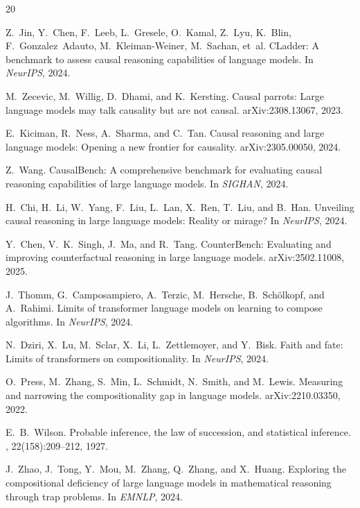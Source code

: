 \documentclass[11pt,a4paper]{article}
\begin{document}
\begin{thebibliography}{20}

Z.~Jin, Y.~Chen, F.~Leeb, L.~Gresele, O.~Kamal, Z.~Lyu, K.~Blin, F.~Gonzalez~Adauto, M.~Kleiman-Weiner, M.~Sachan, et~al.
\newblock CLadder: A benchmark to assess causal reasoning capabilities of language models.
\newblock In {\em NeurIPS}, 2024.

M.~Zecevic, M.~Willig, D.~Dhami, and K.~Kersting.
\newblock Causal parrots: Large language models may talk causality but are not causal.
\newblock arXiv:2308.13067, 2023.

E.~Kiciman, R.~Ness, A.~Sharma, and C.~Tan.
\newblock Causal reasoning and large language models: Opening a new frontier for causality.
\newblock arXiv:2305.00050, 2024.

Z.~Wang.
\newblock CausalBench: A comprehensive benchmark for evaluating causal reasoning capabilities of large language models.
\newblock In {\em SIGHAN}, 2024.

H.~Chi, H.~Li, W.~Yang, F.~Liu, L.~Lan, X.~Ren, T.~Liu, and B.~Han.
\newblock Unveiling causal reasoning in large language models: Reality or mirage?
\newblock In {\em NeurIPS}, 2024.

Y.~Chen, V.~K.~Singh, J.~Ma, and R.~Tang.
\newblock CounterBench: Evaluating and improving counterfactual reasoning in large language models.
\newblock arXiv:2502.11008, 2025.

J.~Thomm, G.~Camposampiero, A.~Terzic, M.~Hersche, B.~Sch{\"o}lkopf, and A.~Rahimi.
\newblock Limits of transformer language models on learning to compose algorithms.
\newblock In {\em NeurIPS}, 2024.

N.~Dziri, X.~Lu, M.~Sclar, X.~Li, L.~Zettlemoyer, and Y.~Bisk.
\newblock Faith and fate: Limits of transformers on compositionality.
\newblock In {\em NeurIPS}, 2024.

O.~Press, M.~Zhang, S.~Min, L.~Schmidt, N.~Smith, and M.~Lewis.
\newblock Measuring and narrowing the compositionality gap in language models.
\newblock arXiv:2210.03350, 2022.

E.~B.~Wilson.
\newblock Probable inference, the law of succession, and statistical inference.
, 22(158):209--212, 1927.

J.~Zhao, J.~Tong, Y.~Mou, M.~Zhang, Q.~Zhang, and X.~Huang.
\newblock Exploring the compositional deficiency of large language models in mathematical reasoning through trap problems.
\newblock In {\em EMNLP}, 2024.

\end{thebibliography}
\end{document}

